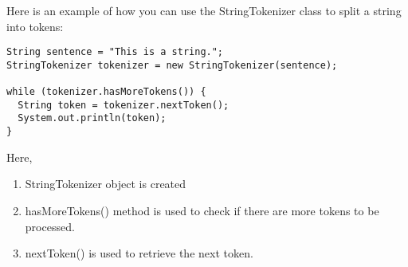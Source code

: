 \documentclass[a4paper, 12pt]{scrarticle}
\begin{document}
Here is an example of how you can use the StringTokenizer class to split a string into tokens:

\begin{verbatim}
String sentence = "This is a string.";
StringTokenizer tokenizer = new StringTokenizer(sentence);

while (tokenizer.hasMoreTokens()) {
  String token = tokenizer.nextToken();
  System.out.println(token);
}
\end{verbatim}
Here, 
\begin{enumerate}
  \item StringTokenizer object is created
  \item hasMoreTokens() method is used to check if there are more tokens to be processed.
  \item nextToken() is used to retrieve the next token.
\end{enumerate}
\end{document}
